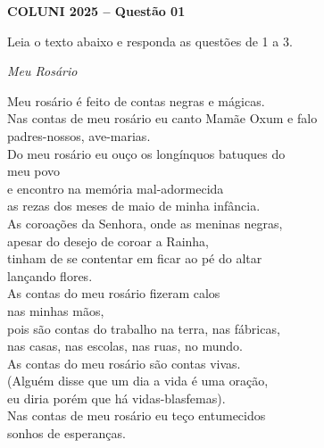 \textbf{COLUNI 2025 -- Questão 01}\par\medskip Leia o texto abaixo e responda as questões de 1 a 3.\par\medskip

\begin{center}\textit{Meu Rosário}\end{center}

\noindent
\begin{minipage}[t]{0.49\linewidth}
Meu rosário é feito de contas negras e mágicas.\\
Nas contas de meu rosário eu canto Mamãe Oxum e falo\\
padres-nossos, ave-marias.\\
Do meu rosário eu ouço os longínquos batuques do\\
meu povo\\
e encontro na memória mal-adormecida\\
as rezas dos meses de maio de minha infância.\\
As coroações da Senhora, onde as meninas negras,\\
apesar do desejo de coroar a Rainha,\\
tinham de se contentar em ficar ao pé do altar\\
lançando flores.\\
As contas do meu rosário fizeram calos\\
nas minhas mãos,\\
pois são contas do trabalho na terra, nas fábricas,\\
nas casas, nas escolas, nas ruas, no mundo.\\
As contas do meu rosário são contas vivas.\\
(Alguém disse que um dia a vida é uma oração,\\
eu diria porém que há vidas-blasfemas).\\
Nas contas de meu rosário eu teço entumecidos\\
sonhos de esperanças.
\end{minipage}\hfill
